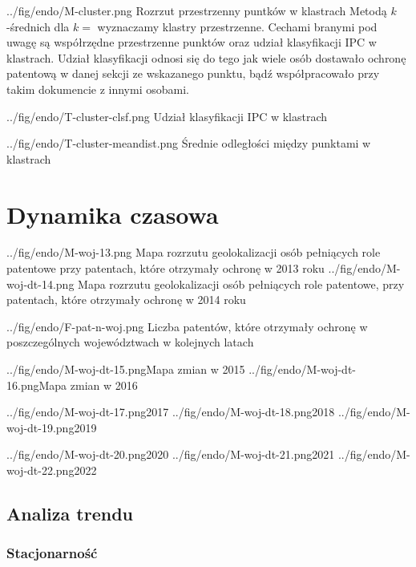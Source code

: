 \figside
  {../fig/endo/M-cluster.png}
    {Rozrzut przestrzenny puntków w klastrach}
{
  Metodą $k$-średnich dla $k=$ wyznaczamy klastry przestrzenne. 
  Cechami branymi pod uwagę są współrzędne przestrzenne punktów oraz
  udział klasyfikacji \ac{IPC} w klastrach. Udział klasyfikacji
  odnosi się do tego jak wiele osób dostawało ochronę patentową
  w danej sekcji ze wskazanego punktu, bądź współpracowało przy
  takim dokumencie z innymi osobami.
}

\tblside
  {../fig/endo/T-cluster-clsf.png}
    {Udział klasyfikacji \ac{IPC} w klastrach}

\tblside
  {../fig/endo/T-cluster-meandist.png}
    {Średnie odległości między punktami w klastrach}




    \newpage\section{Dynamika czasowa}

  \figsides
{../fig/endo/M-woj-13.png}
{ Mapa rozrzutu geolokalizacji osób pełniących role patentowe 
  przy patentach, które otrzymały ochronę w 2013 roku}
{../fig/endo/M-woj-dt-14.png}
{ Mapa rozrzutu geolokalizacji osób pełniących role patentowe, 
  przy patentach, które otrzymały ochronę w 2014 roku}

  \figside
{../fig/endo/F-pat-n-woj.png}
{ Liczba patentów, które otrzymały ochronę w poszczególnych województwach 
  w kolejnych latach }

  \newpage\figsides
{../fig/endo/M-woj-dt-15.png}{Mapa zmian w 2015}
{../fig/endo/M-woj-dt-16.png}{Mapa zmian w 2016}

  \figsidesTri
{../fig/endo/M-woj-dt-17.png}{2017}
{../fig/endo/M-woj-dt-18.png}{2018}
{../fig/endo/M-woj-dt-19.png}{2019}

  \figsidesTri
{../fig/endo/M-woj-dt-20.png}{2020}
{../fig/endo/M-woj-dt-21.png}{2021}
{../fig/endo/M-woj-dt-22.png}{2022}



  \newpage\subsection
{Analiza trendu}



  \subsubsection
{Stacjonarność}

